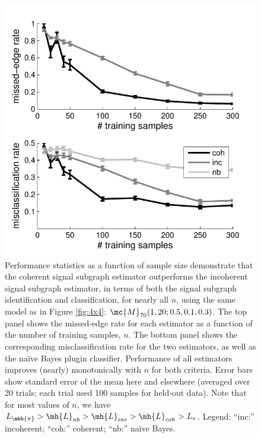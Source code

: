 \documentclass[10pt,journal,cspaper,compsoc]{IEEEtran}
\begin{document}
\begin{figure}[htbp]
	\centering
		\includegraphics[width=1.0\linewidth]{../figs/homo_V70_s20_p10_q30_Lhats.pdf}
	\caption{Performance statistics as a function of sample size demonstrate that the coherent signal subgraph estimator outperforms the incoherent signal subgraph estimator, in terms of both the signal subgraph identification and classification, for nearly all $n$, using the same model as in Figure \ref{fig:4x4}: $\mc{M}_{70}(1,20;0.5,0.1,0.3)$.  The top panel shows the missed-edge rate for each estimator as a function of the number of training samples, $n$.  The bottom panel shows the corresponding misclassification rate for the two estimators, as well as the na\"ive Bayes plugin classifier.  Performance of all estimators improves (nearly) monotonically with $n$ for both criteria.  Error bars show standard error of the mean here and elsewhere (averaged over 20 trials; each trial used 100 samples for held-out data). Note that for most values of $n$, we have $L_{\mhb{\pi}} > \mh{L}_{nb} > \mh{L}_{inc} > \mh{L}_{coh} > L_*$. Legend: ``inc:'' incoherent; ``coh:'' coherent; ``nb:'' na\"ive Bayes.}
	\label{fig:homo}
\end{figure}
\end{document}
